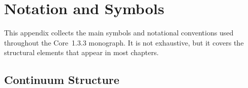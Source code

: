 
\section{Notation and Symbols}
\label{app:notation}

This appendix collects the main symbols and notational conventions used
throughout the Core~1.3.3 monograph.  It is not exhaustive, but it covers the
structural elements that appear in most chapters.

\subsection{Continuum Structure}

